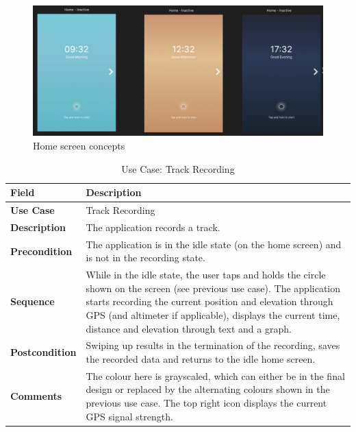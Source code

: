 \documentclass[12pt]{article}
\begin{document}
\begin{figure}[h!]
    \centering
    \includegraphics[width=\textwidth]{Project_Screenshots/GUIconcept.png}
    \caption{Home screen concepts}
\end{figure}

\begin{table}[h!]
\centering
\begin{tabular}{|p{3cm}|p{11cm}|}
\hline
\textbf{Field} & \textbf{Description} \\
\hline
\textbf{Use Case}   & Track Recording \\
\hline
\textbf{Description} & The application records a track. \\
\hline
\textbf{Precondition} & The application is in the idle state (on the home screen) and is not in the recording state. \\
\hline
\textbf{Sequence} & While in the idle state, the user taps and holds the circle shown on the screen (see previous use case). The application starts recording the current position and elevation through GPS (and altimeter if applicable), displays the current time, distance and elevation through text and a graph. \\
\hline
\textbf{Postcondition} & Swiping up results in the termination of the recording, saves the recorded data and returns to the idle home screen. \\
\hline
\textbf{Comments} & The colour here is grayscaled, which can either be in the final design or replaced by the alternating colours shown in the previous use case. The top right icon displays the current GPS signal strength. \\
\hline
\end{tabular}
\caption{Use Case: Track Recording}
\end{table}
\end{document}
